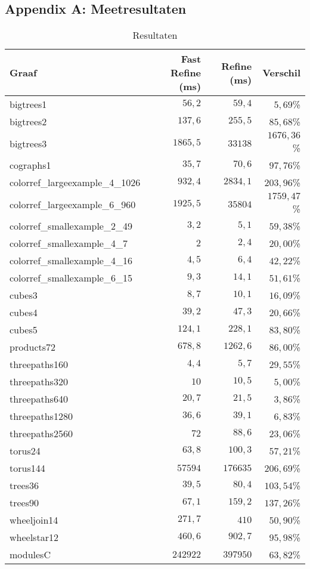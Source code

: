 \documentclass[twoside]{article}
\begin{document}
\subsection{Appendix A: Meetresultaten} \label{AppendixA}

\begin{table}[H]
\caption{Resultaten}\label{table:resultaten}
\centering
\begin{tabular}{lrrr}
\toprule
Graaf & Fast Refine (ms) & Refine (ms) & Verschil \\
\midrule
\midrule
bigtrees1 & $56,2$ & $59,4$ & $5,69$\% \\
bigtrees2 & $137,6$ & $255,5$ & $85,68$\% \\
bigtrees3 & $1865,5$ & $33138$ & $1676,36$\% \\
cographs1 & $35,7$ & $70,6$ & $97,76$\% \\
colorref\_largeexample\_4\_1026 & $932,4$ & $2834,1$ & $203,96$\% \\
colorref\_largeexample\_6\_960 & $1925,5$ & $35804$ & $1759,47$\% \\
colorref\_smallexample\_2\_49 & $3,2$ & $5,1$ & $59,38$\% \\
colorref\_smallexample\_4\_7 & $2$ & $2,4$ & $20,00$\% \\
colorref\_smallexample\_4\_16 & $4,5$ & $6,4$ & $42,22$\% \\
colorref\_smallexample\_6\_15 & $9,3$ & $14,1$ & $51,61$\% \\
cubes3 & $8,7$ & $10,1$ & $16,09$\% \\
cubes4 & $39,2$ & $47,3$ & $20,66$\% \\
cubes5 & $124,1$ & $228,1$ & $83,80$\% \\
products72 & $678,8$ & $1262,6$ & $86,00$\% \\
threepaths160 & $4,4$ & $5,7$ & $29,55$\% \\
threepaths320 & $10$ & $10,5$ & $5,00$\% \\
threepaths640 & $20,7$ & $21,5$ & $3,86$\% \\
threepaths1280 & $36,6$ & $39,1$ & $6,83$\% \\
threepaths2560 & $72$ & $88,6$ & $23,06$\% \\
torus24 & $63,8$ & $100,3$ & $57,21$\% \\
torus144 & $57594$ & $176635$ & $206,69$\% \\
trees36 & $39,5$ & $80,4$ & $103,54$\% \\
trees90 & $67,1$ & $159,2$ & $137,26$\% \\
wheeljoin14 & $271,7$ & $410$ & $50,90$\% \\
wheelstar12 & $460,6$ & $902,7$ & $95,98$\% \\
modulesC & $242922$ & $397950$ & $63,82$\% \\

\bottomrule
\end{tabular}
\end{table}
\end{document}

